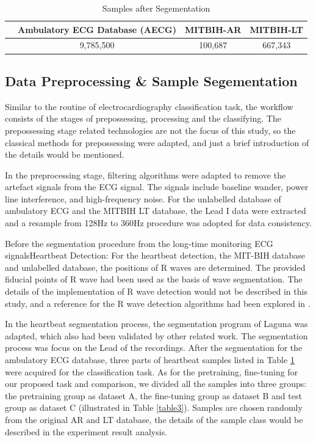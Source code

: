 \documentclass[journal]{IEEEtran}
\begin{document}
\begin{table}[!htbp]
\begin{center}
\begin{threeparttable}
\caption{Samples after Segementation}

\label{table2}
\begin{tabular}{cccc}
\hline
& Ambulatory ECG Database (AECG) & MITBIH-AR &  MITBIH-LT\\
\hline
& 9,785,500 & 100,687 &  667,343 \\
\hline
\end{tabular}
\end{threeparttable}
\end{center}
\end{table}


\subsection{Data Preprocessing \& Sample Segementation}
Similar to the routine of electrocardiography classification task, the workflow consists of the stages of prepossessing, processing  and the classifying. The prepossessing stage related technologies are not the focus of this study, so the classical methods for prepossessing were adapted, and just a brief introduction of the details would be mentioned. 

In the preprocessing stage, filtering algorithms were adapted to remove the artefact signals from the ECG signal. The signals include baseline wander, power line interference, and high-frequency noise. For the unlabelled database of ambulatory ECG and the MITBIH LT database, the Lead I data were extracted and a resample from 128Hz to 360Hz procedure was adopted for data consistency.

Before the segmentation procedure from the long-time monitoring ECG signalsHeartbeat Detection: For the heartbeat detection, the MIT-BIH database and unlabelled database, the positions of R waves are determined. The provided fiducial points of R wave had been used as the basis of wave segmentation. The details of the implementation of R wave detection would not be described in this study, and a reference for the R wave detection algorithms had been explored in \cite{afonso}.

In the heartbeat segmentation process, the segmentation program of Laguna \cite{sornmo2006electrocardiogram} was adapted, which also had been validated by other related work\cite{chaza}. The segmentation process was focus on the Lead  \uppercase\expandafter{} of the recordings. After the segmentation for the ambulatory ECG database, three parts of heartbeat samples listed in Table \ref{table2} were acquired for the classification task. As for the pretraining, fine-tuning for our proposed task and comparison, we divided all the samples into three groups: the pretraining group as dataset A, the fine-tuning group as dataset B and test group as dataset C (illustrated in Table \ref{table3}). Samples are chosen randomly from the original AR and LT database, the details of the sample class would be described in the experiment result analysis.
\end{document}
